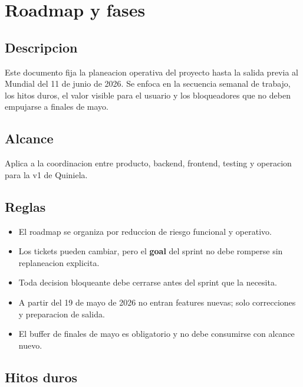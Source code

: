\section{Roadmap y fases}

\subsection{Descripcion}

Este documento fija la planeacion operativa del proyecto hasta la salida previa al Mundial del 11 de junio de 2026. Se enfoca en la secuencia semanal de trabajo, los hitos duros, el valor visible para el usuario y los bloqueadores que no deben empujarse a finales de mayo.

\subsection{Alcance}

Aplica a la coordinacion entre producto, backend, frontend, testing y operacion para la v1 de Quiniela.

\subsection{Reglas}

\begin{itemize}
  \item El roadmap se organiza por reduccion de riesgo funcional y operativo.
  \item Los tickets pueden cambiar, pero el \textbf{goal} del sprint no debe romperse sin replaneacion explicita.
  \item Toda decision bloqueante debe cerrarse antes del sprint que la necesita.
  \item A partir del 19 de mayo de 2026 no entran features nuevas; solo correcciones y preparacion de salida.
  \item El buffer de finales de mayo es obligatorio y no debe consumirse con alcance nuevo.
\end{itemize}

\subsection{Hitos duros}

